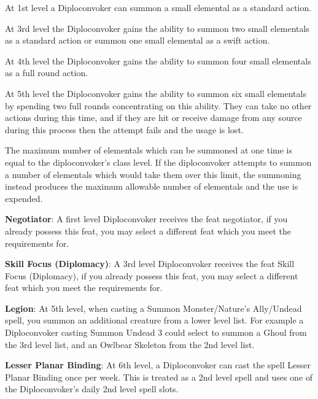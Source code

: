 At 1st level a Diploconvoker can summon a small elemental as a standard action.

At 3rd level the Diploconvoker gains the ability to summon two small elementals as a standard action or summon one small elemental as a swift action.

At 4th level the Diploconvoker gains the ability to summon four small elementals as a full round action.

At 5th level the Diploconvoker gains the ability to summon six small elementals by spending two full rounds concentrating on this ability. They can take no other actions during this time, and if they are hit or receive damage from any source during this process then the attempt fails and the usage is lost. 

The maximum number of elementals which can be summoned at one time is equal to the diploconvoker's class level. If the diploconvoker attempts to summon a number of elementals which would take them over this limit, the summoning instead produces the maximum allowable number of elementals and the use is expended.

\textbf{Negotiator}: A first level Diploconvoker receives the feat negotiator, if you already possess this feat, you may select a different feat which you meet the requirements for.
 
\textbf{Skill Focus (Diplomacy)}: A 3rd level Diploconvoker receives the feat Skill Focus (Diplomacy), if you already possess this feat, you may select a different feat which you meet the requirements for.

\textbf{Legion}: At 5th level, when casting a Summon Monster/Nature’s Ally/Undead spell, you summon an additional creature from a lower level list. For example a Diploconvoker casting Summon Undead 3 could select to summon a Ghoul from the 3rd level list, and an Owlbear Skeleton from the 2nd level list.

\textbf{Lesser Planar Binding}: At 6th level, a Diploconvoker can cast the spell Lesser Planar Binding once per week. This is treated as a 2nd level spell and uses one of the Diploconvoker’s daily 2nd level spell slots.

